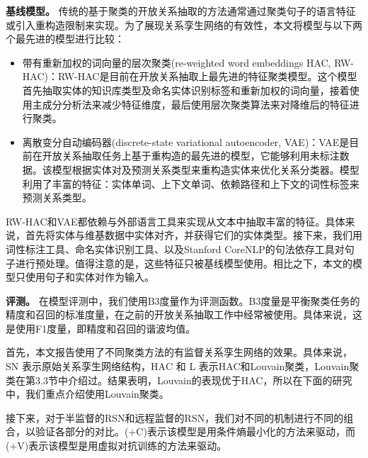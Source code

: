 \begin{translation}
\textbf{基线模型。} 传统的基于聚类的开放关系抽取的方法通常通过聚类句子的语言特征或引入重构造限制来实现。为了展现关系孪生网络的有效性，本文将模型与以下两个最先进的模型进行比较：
\begin{itemize}
	\item 带有重新加权的词向量的层次聚类(re-weighted word embeddings HAC, RW-HAC)：RW-HAC是目前在开放关系抽取上最先进的特征聚类模型。这个模型首先抽取实体的知识库类型及命名实体识别标签和重新加权的词向量，接着使用主成分分析法来减少特征维度，最后使用层次聚类算法来对降维后的特征进行聚类。
	\item 离散变分自动编码器(discrete-state variational autoencoder, VAE)：VAE是目前在开放关系抽取任务上基于重构造的最先进的模型，它能够利用未标注数据。该模型根据实体对及预测关系类型来重构造实体来优化关系分类器。模型利用了丰富的特征：实体单词、上下文单词、依赖路径和上下文的词性标签来预测关系类型。
\end{itemize}

RW-HAC和VAE都依赖与外部语言工具来实现从文本中抽取丰富的特征。具体来说，首先将实体与维基数据中实体对齐，并获得它们的实体类型。接下来，我们用词性标注工具、命名实体识别工具、以及Stanford CoreNLP的句法依存工具对句子进行预处理。值得注意的是，这些特征只被基线模型使用。相比之下，本文的模型只使用句子和实体对作为输入。

\textbf{评测。} 在模型评测中，我们使用B3度量作为评测函数。B3度量是平衡聚类任务的精度和召回的标准度量，在之前的开放关系抽取工作中经常被使用。具体来说，这是使用F1度量，即精度和召回的谐波均值。

首先，本文报告使用了不同聚类方法的有监督关系孪生网络的效果。具体来说，$\text{SN}$ 表示原始关系孪生网络结构，$\text{HAC}$ 和 $\text{L}$ 表示HAC和Louvain聚类，Louvain聚类在第3.3节中介绍过。结果表明，Louvain的表现优于HAC，所以在下面的研究中，我们重点介绍使用Louvain聚类。

接下来，对于半监督的RSN和远程监督的RSN，我们对不同的机制进行不同的组合，以验证各部分的对比。(+C)表示该模型是用条件熵最小化的方法来驱动，而(+V)表示该模型是用虚拟对抗训练的方法来驱动。




\end{translation}
